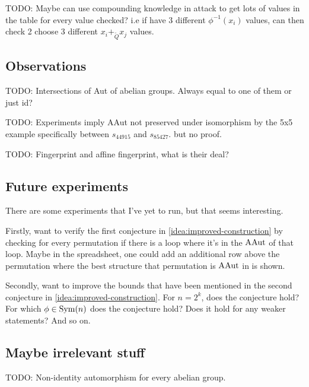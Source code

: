 \begin{idea}
    TODO: Maybe can use compounding knowledge in attack to get lots of values in the table for every value checked? i.e if have 3 different \( \phi^{-1}(x_i) \) values, can then check 2 choose 3 different \( x_i +_{\tilde{Q}} x_j  \) values.
\end{idea}

\subsection{Observations}

\begin{idea}
    TODO: Intersections of Aut of abelian groups. Always equal to one of them or just id?

\end{idea}

\begin{idea}
    TODO: Experiments imply AAut not preserved under isomorphism by the 5x5 example specifically between \( s_{44915} \) and \( s_{85427} \). but no proof.
\end{idea}

\begin{idea} \label{idea:fingerprints}
    TODO: Fingerprint and affine fingerprint, what is their deal?
\end{idea}

\subsection{Future experiments}

There are some experiments that I've yet to run, but that seems interesting.

\begin{idea}
    Firstly, want to verify the first conjecture in \autoref{idea:improved-construction} by checking for every permutation if there is a loop where it's in the \( \operatorname{AAut} \) of that loop. Maybe in the spreadsheet, one could add an additional row above the permutation where the best structure that permutation is \( \operatorname{AAut} \) in is shown.
\end{idea}

\begin{idea}
    Secondly, want to improve the bounds that have been mentioned in the second conjecture in \autoref{idea:improved-construction}. For \( n = 2^k \), does the conjecture hold? For which \( \phi \in \operatorname{Sym}(n) \) does the conjecture hold? Does it hold for any weaker statements? And so on.
\end{idea}

\subsection{Maybe irrelevant stuff}

\begin{idea}
    TODO: Non-identity automorphism for every abelian group.
\end{idea}